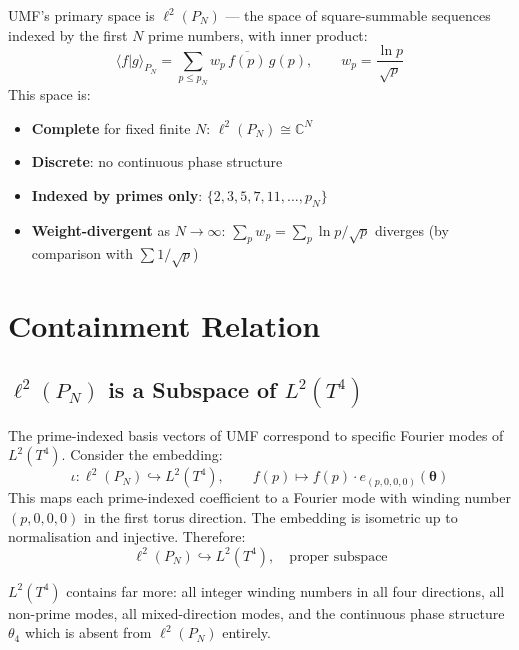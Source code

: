 UMF's primary space is $\ell^2(P_N)$ — the space of square-summable sequences
indexed by the first $N$ prime numbers, with inner product:
\begin{equation}
  \langle f | g \rangle_{P_N} = \sum_{p \leq p_N} w_p\, \overline{f(p)}\, g(p),
  \qquad w_p = \frac{\ln p}{\sqrt{p}}
  \tag{244.2}
\end{equation}
This space is:
\begin{itemize}
  \item \textbf{Complete} for fixed finite $N$: $\ell^2(P_N) \cong \mathbb{C}^N$
  \item \textbf{Discrete}: no continuous phase structure
  \item \textbf{Indexed by primes only}: $\{2, 3, 5, 7, 11, \ldots, p_N\}$
  \item \textbf{Weight-divergent} as $N\to\infty$: $\sum_p w_p = \sum_p \ln p/\sqrt{p}$
    diverges (by comparison with $\sum 1/\sqrt{p}$)
\end{itemize}

\section{Containment Relation}

\subsection{\texorpdfstring{$\ell^2(P_N)$}{ell2(P\_N)} is a Subspace of \texorpdfstring{$L^2(T^4)$}{L2(T4)}}

The prime-indexed basis vectors of UMF correspond to specific Fourier modes
of $L^2(T^4)$. Consider the embedding:
\begin{equation}
  \iota: \ell^2(P_N) \hookrightarrow L^2(T^4),
  \qquad f(p) \mapsto f(p)\cdot e_{(p,0,0,0)}(\symbf{\theta})
  \tag{244.3}
\end{equation}
This maps each prime-indexed coefficient to a Fourier mode with winding number
$(p, 0, 0, 0)$ in the first torus direction. The embedding is isometric up to
normalisation and injective. Therefore:
\begin{equation}
  \boxed{\ell^2(P_N) \hookrightarrow L^2(T^4), \quad \text{proper subspace}}
  \tag{244.4}
\end{equation}

$L^2(T^4)$ contains far more: all integer winding numbers in all four directions,
all non-prime modes, all mixed-direction modes, and the continuous phase structure
$\theta_4$ which is absent from $\ell^2(P_N)$ entirely.

